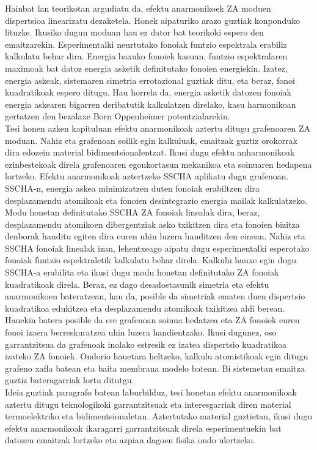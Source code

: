 Hainbat lan teorikotan\cite{wang2016anharmonic,los2009scaling,katsnelson2013graphene,zakharchenko2009finite,mariani2008flexural,amorim2014thermodynamics,de2012bending} argudiatu da, efektu anarmonikoek ZA moduen dispertsioa linearizatu 
dezaketela. Honek aipaturiko arazo guztiak konponduko lituzke. Ikusiko dugun moduan hau ez dator bat teorikoki espero 
den emaitzarekin. Esperimentalki neurtutako fonoiak funtzio espektrala erabiliz kalkulatu behar dira. Energia baxuko 
fonoiek kasuan, funtzio espektralaren maximoak bat datoz energia asketik definitutako fonoien energiekin. Izatez, 
energia askeak, sistemaren simetria errotazional guztiak ditu, eta beraz, fonoi kuadratikoak espero ditugu. Hau 
horrela da, energia asketik datozen fonoiak energia askearen bigarren deribatutik kalkulatzen 
direlako, kasu harmonikoan gertatzen den bezalaxe Born Oppenheimer potentzialarekin. \\

Tesi honen azken kapituluan efektu anarmonikoak aztertu ditugu grafenoaren ZA moduan. Nahiz eta grafenoan soilik 
egin kalkuluak, emaitzak guztiz orokorrak dira edozein material bidimentsionalentzat. Ikusi dugu efektu anharmonikoak 
ezinbestekoak direla grafenoaren egonkortasun mekanikoa eta soinuaren hedapena lortzeko. Efektu anarmonikoak 
aztertzeko SSCHA aplikatu dugu grafenoan. SSCHA-n, energia askea minimizatzen duten fonoiak erabiltzen dira 
desplazamendu atomikoak eta fonoien desintegrazio energia mailak kalkulatzeko. Modu honetan definitutako 
SSCHA ZA fonoiak linealak dira, beraz, desplazamendu atomikoen dibergentziak asko txikitzen dira eta fonoien bizitza 
denborak handitu egiten dira euren uhin luzera handitzen den einean. Nahiz eta SSCHA fonoiak linealak izan, 
lehentxeago aipatu dugu esperimentalki esperotako fonoiak funtzio espektraletik kalkulatu behar direla. Kalkulu 
hauxe egin dugu SSCHA-a erabilita eta ikusi dugu modu honetan definitutako ZA fonoiak kuadratikoak direla. Beraz, 
ez dago desadostasunik simetria eta efektu anarmonikoen bateratzean, hau da, posible da simetriak ematen duen 
dispertsio kuadratikoa edukitzea eta desplazamendu atomikoak txikitzea aldi berean. Hauekin batera posible da ere 
grafenoan soinua hedatzea eta ZA fonoiek euren fonoi izaera berreskuratzea uhin luzera handientzako. Ikusi dugunez, 
oso garrantzitsua da grafenoak inolako estresik ez izatea dispertsio kuadratikoa izateko ZA fonoiek. Ondorio hauetara 
heltzeko, kalkulu atomistikoak egin ditugu grafeno xafla batean eta baita membrana modelo batean. Bi sistemetan 
emaitza guztiz bateragarriak lortu ditutgu. \\

Ideia guztiak paragrafo batean laburbilduz, tesi honetan efektu anarmonikoak aztertu ditugu teknologikoki 
garrantzitsuak eta interesgarriak diren material termoelektriko eta bidimentsionaletan. Aztertutako material 
guztietan, ikusi dugu efektu anarmonikoak ikaragarri garrantzitsuak direla esperimentuekin bat datozen emaitzak 
lortzeko eta azpian dagoen fisika ondo ulertzeko.
